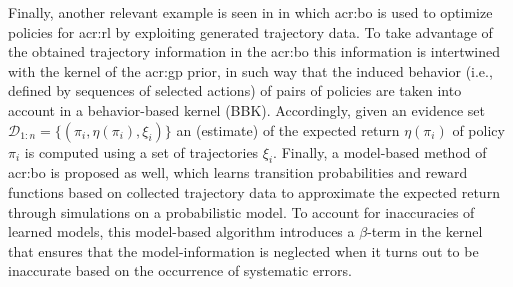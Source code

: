 Finally, another relevant example is seen in \cite{wilson2014using} in which \acrlong{acr:bo} is used to optimize policies for \acrshort{acr:rl} by exploiting generated trajectory data.
To take advantage of the obtained trajectory information in the \acrlong{acr:bo} this information is intertwined with the kernel of the \acrshort{acr:gp} prior, in such way that the induced behavior (i.e., defined by sequences of selected actions) of pairs of policies are taken into account in a behavior-based kernel (BBK).
Accordingly, given an evidence set $\mathcal{D}_{1:n} = \{(\pi_i, \eta(\pi_i), \xi_i)\}$ an (estimate) of the expected return $\eta(\pi_i)$ of policy $\pi_i$ is computed using a set of trajectories $\xi_i$.
Finally, a model-based method of \acrlong{acr:bo} is proposed as well, which learns transition probabilities and reward functions based on collected trajectory data to approximate the expected return through simulations on a probabilistic model.
To account for inaccuracies of learned models, this model-based algorithm introduces a $\beta$-term in the kernel that ensures that the model-information is neglected when it turns out to be inaccurate based on the occurrence of systematic errors.


